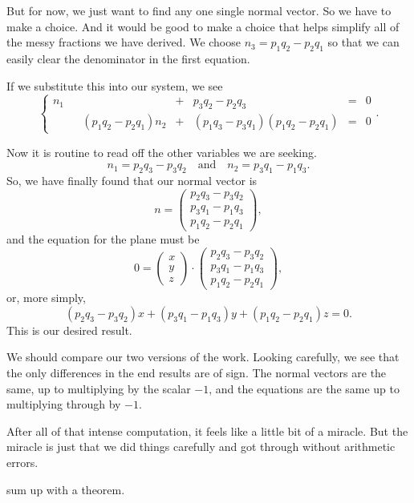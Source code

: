\documentclass[00-livre-main.tex]{subfiles}
\begin{document}
But for now, we just want to find any one single normal vector. So we have to make a choice. And it would be good to make a choice that helps simplify all of the messy fractions we have derived. We choose $n_3 = p_1q_2 - p_2q_1$ so that we can easily clear the denominator in the first equation. 

If we substitute this into our system, we see
\[
\left\{ \begin{array}{rrrrrrr}
n_1 &  &  & + & p_3q_2 - p_2q_3 & = & 0 \\
& &(p_1q_2-p_2q_1) n_2 & + & (p_1q_3-p_3q_1)(p_1q_2-p_2q_1)  & = & 0 
\end{array}\right. .
\]

Now it is routine to read off the other variables we are seeking.
\[
n_1 = p_2q_3 - p_3q_2 \quad \text{and} \quad n_2 = p_3q_1-p_1q_3.
\]
So, we have finally found that our normal vector is
\[
n = \begin{pmatrix} p_2 q_3 - p_3 q_2 \\
p_3 q_1 - p_1 q_3 \\ p_1 q_2 - p_2 q_1 \end{pmatrix},
\]
and the equation for the plane must be
\[
0 = \begin{pmatrix}x \\ y \\ z \end{pmatrix} \cdot \begin{pmatrix} p_2 q_3 - p_3 q_2 \\
p_3 q_1 - p_1 q_3 \\ p_1 q_2 - p_2 q_1 \end{pmatrix},
\]
or, more simply, 
\[
(p_2 q_3 - p_3 q_2) x +
(p_3 q_1 - p_1 q_3) y +
(p_1 q_2 - p_2 q_1) z = 0.
\]
This is our desired result.

We should compare our two versions of the work. Looking carefully, we see that the only differences in the end results are of sign. The normal vectors are the same, up to multiplying by the scalar $-1$, and the equations are the same up to multiplying through by $-1$.

After all of that intense computation, it feels like a little bit of a miracle. But the miracle is just that we did things carefully and got through without arithmetic errors.

\begin{theorem}




sum up with a theorem.
\end{theorem}
\end{document}
